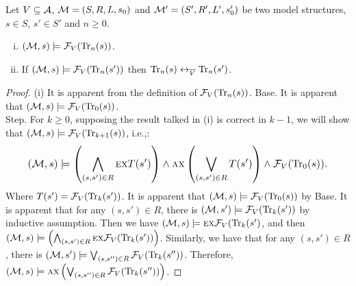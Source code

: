 \documentclass[letterpaper]{article} %
\begin{document}
\begin{lemma}\label{Bn:to:Tn}
Let $V\subseteq {\cal A}$, ${\cal M}=(S, R, L,s_0)$ and ${\cal M}'=(S', R', L',s_0')$ be two model structures,
$s\in S$, $s'\in S'$ and $n\ge 0$.
\begin{enumerate}[(i)]
  \item $({\cal M},s)\models{\cal F}_V(\textrm{Tr}_n(s))$.
  \item If $({\cal M},s)\models{\cal F}_V(\textrm{Tr}_n(s'))$ then
  $\textrm{Tr}_n(s) \leftrightarrow_{\overline V} \textrm{Tr}_n(s')$.
\end{enumerate}
\end{lemma}
\begin{proof}
(i) It is apparent from the definition of ${\cal F}_V(\textrm{Tr}_n(s))$.
Base. It is apparent that $({\cal M},s)\models {\cal F}_V(\textrm{Tr}_0(s))$.\\
Step. For $k \geq 0$, supposing the result talked in (i) is correct in $k - 1$, we will show that $({\cal M},s)\models {\cal F}_V(\textrm{Tr}_{k+1}(s))$, i.e.,:
\begin{equation*}
\resizebox{.91\linewidth}{!}{$
    \displaystyle
 ({\cal M},s)\models \left(\bigwedge_{(s,s')\in R}
    \EXIST \NEXT T(s')\right)
    \wedge \ALL \NEXT\left(\bigvee_{(s,s')\in R}
    T(s')\right)
    \wedge {\cal F}_V(\Tr_0(s)).%
 $}
\end{equation*}
Where $T(s') ={\cal F}_V(\textrm{Tr}_k(s'))$. It is apparent that $({\cal M},s)\models {\cal F}_V(\textrm{Tr}_0(s))$ by Base. It is apparent that for any $(s,s') \in R$, there is $({\cal M}, s') \models {\cal F}_V(\textrm{Tr}_k(s'))$ by inductive assumption. Then we have $({\cal M},s)\models \textsc{e} \textsc{x} {\cal F}_V(\textrm{Tr}_k(s')$, and then $({\cal M},s)\models \left(\bigwedge_{(s,s')\in R}
    \textsc{e} \textsc{x} {\cal F}_V(\textrm{Tr}_k(s'))\right)$. Similarly, we have that for any $(s,s') \in R$, there is $({\cal M}, s') \models \bigvee_{(s,s'')\in R}
    {\cal F}_V(\textrm{Tr}_k(s'') )$. Therefore, $({\cal M},s)\models \textsc{a} \textsc{x}\left(\bigvee_{(s,s'')\in R}
    {\cal F}_V(\textrm{Tr}_k(s'') )\right)$.


\end{proof}
\end{document}

